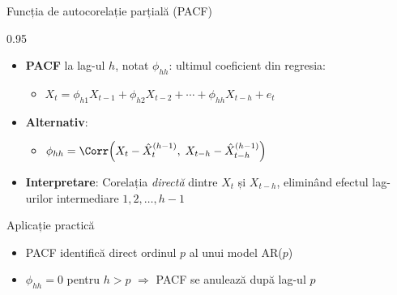 \documentclass[9pt, aspectratio=169, t]{beamer}
\begin{document}
\begin{frame}{Funcția de autocorelație parțială (PACF)}
    \begin{cminipage}{0.95\textwidth}
        \begin{defn}
            \begin{itemize}\setlength{\itemsep}{0pt}
                \item \textbf{PACF} la lag-ul $h$, notat $\phi_{hh}$: ultimul coeficient din regresia:
                \begin{itemize}
                    \item $X_t = \phi_{h1}X_{t-1} + \phi_{h2}X_{t-2} + \cdots + \phi_{hh}X_{t-h} + e_t$
                \end{itemize}
                \item \textbf{Alternativ}:
                \begin{itemize}
                    \item $\phi_{hh} = \Corr\!\left(X_t - \hat{X}_t^{(h-1)},\; X_{t-h} - \hat{X}_{t-h}^{(h-1)}\right)$
                \end{itemize}
                \item \textbf{Interpretare}: Corelația \textit{directă} dintre $X_t$ și $X_{t-h}$, eliminând efectul lag-urilor intermediare $1, 2, \ldots, h-1$
            \end{itemize}
        \end{defn}

        \begin{exampleblock}{Aplicație practică}
            \begin{itemize}\setlength{\itemsep}{0pt}
                \item PACF identifică direct ordinul $p$ al unui model AR($p$)
                \item $\phi_{hh} = 0$ pentru $h > p$ $\Rightarrow$ PACF se anulează după lag-ul $p$
            \end{itemize}
        \end{exampleblock}
    \end{cminipage}
\end{frame}
\end{document}
